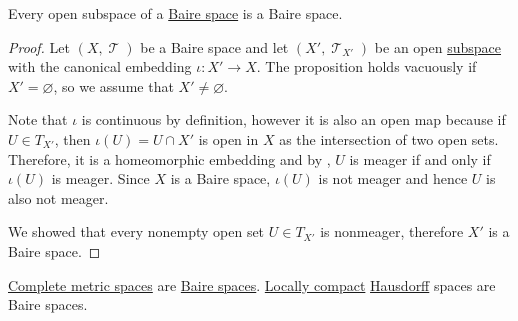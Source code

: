 \begin{proposition}\label{thm:open_subspace_of_baire_space_is_baire}
  Every open subspace of a \hyperref[def:baire_space]{Baire space} is a Baire space.
\end{proposition}
\begin{proof}
  Let \( (X, \mscrT) \) be a Baire space and let \( (X', \mscrT_{X'}) \) be an open \hyperref[def:topological_subspace]{subspace} with the canonical embedding \( \iota: X' \to X \). The proposition holds vacuously if \( X' = \varnothing \), so we assume that \( X' \neq \varnothing \).

  Note that \( \iota \) is continuous by definition, however it is also an open map because if \( U \in T_{X'} \), then \( \iota(U) = U \cap X' \) is open in \( X \) as the intersection of two open sets. Therefore, it is a homeomorphic embedding and by , \( U \) is meager if and only if \( \iota(U) \) is meager. Since \( X \) is a Baire space, \( \iota(U) \) is not meager and hence \( U \) is also not meager.

  We showed that every nonempty open set \( U \in T_{X'} \) is nonmeager, therefore \( X' \) is a Baire space.
\end{proof}

\begin{theorem}\label{thm:baire_category_theorem}
  \begin{thmenum}
     \hyperref[def:complete_metric_space]{Complete metric spaces} are \hyperref[def:baire_space]{Baire spaces}.
     \hyperref[def:locally_compact_space]{Locally compact} \hyperref[def:separation_axioms/T2]{Hausdorff} spaces are Baire spaces.
  \end{thmenum}
\end{theorem}
